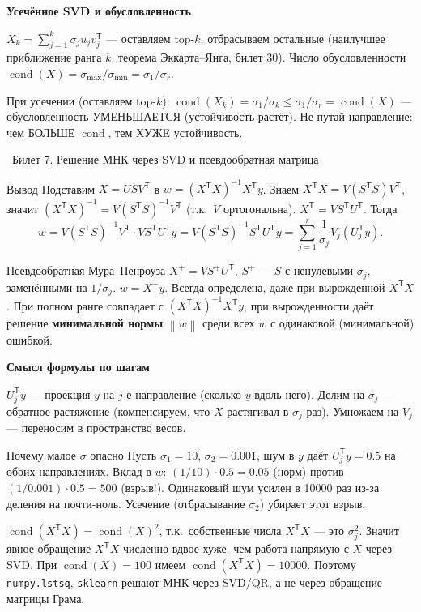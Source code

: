 \documentclass[12pt, a4paper]{article}
\newcommand{\bilet}[2]{%
  \vspace{10pt}%
  \noindent\colorbox{qcolor}{\parbox{\dimexpr\linewidth-2\fboxsep\relax}{%
    \color{white}\large\bfseries\strut\ Билет #1. #2%
  }}%
  \nopagebreak\vspace{5pt}\par\nopagebreak%
}
\newcommand{\qsub}[1]{%
  \vspace{5pt}%
  {\bfseries\color{defblue} #1}%
  \par\vspace{2pt}%
}
\newcommand{\cond}{\operatorname{cond}}
\newcommand{\tr}{^{\mathsf{T}}}
\newcommand{\norm}[1]{\left\lVert #1 \right\rVert}
\begin{document}
\qsub{Усечённое SVD и обусловленность}
$X_k = \sum_{j=1}^k \sigma_j u_j v_j\tr$ --- оставляем top-$k$, отбрасываем остальные (наилучшее приближение ранга $k$, теорема Эккарта--Янга, билет 30). Число обусловленности $\cond(X) = \sigma_{\max}/\sigma_{\min} = \sigma_1/\sigma_r$.

\begin{fishkabox}
При усечении (оставляем top-$k$): $\cond(X_k) = \sigma_1/\sigma_k \le \sigma_1/\sigma_r = \cond(X)$ --- обусловленность УМЕНЬШАЕТСЯ (устойчивость растёт). Не путай направление: чем БОЛЬШЕ $\cond$, тем ХУЖE устойчивость.
\end{fishkabox}

\bilet{7}{Решение МНК через SVD и псевдообратная матрица}

\begin{proofbox}{Вывод}
Подставим $X = USV\tr$ в $w = (X\tr X)^{-1}X\tr y$. Знаем $X\tr X = V(S\tr S)V\tr$, значит $(X\tr X)^{-1} = V(S\tr S)^{-1}V\tr$ (т.к.\ $V$ ортогональна). $X\tr = VS\tr U\tr$. Тогда
\[
  w = V(S\tr S)^{-1}V\tr \cdot V S\tr U\tr y = V(S\tr S)^{-1}S\tr U\tr y = \sum_{j=1}^r \frac{1}{\sigma_j} V_j (U_j\tr y).
\]
\end{proofbox}

\begin{defbox}{Псевдообратная Мура--Пенроуза}
$X^+ = V S^+ U\tr$, $S^+$ --- $S$ с ненулевыми $\sigma_j$, заменёнными на $1/\sigma_j$. $w = X^+ y$. Всегда определена, даже при вырожденной $X\tr X$. При полном ранге совпадает с $(X\tr X)^{-1}X\tr y$; при вырожденности даёт решение \textbf{минимальной нормы} $\norm{w}$ среди всех $w$ с одинаковой (минимальной) ошибкой.
\end{defbox}

\qsub{Смысл формулы по шагам}
$U_j\tr y$ --- проекция $y$ на $j$-е направление (сколько $y$ вдоль него). Делим на $\sigma_j$ --- обратное растяжение (компенсируем, что $X$ растягивал в $\sigma_j$ раз). Умножаем на $V_j$ --- переносим в пространство весов.

\begin{exbox}{Почему малое $\sigma$ опасно}
Пусть $\sigma_1 = 10$, $\sigma_2 = 0.001$, шум в $y$ даёт $U_j\tr y = 0.5$ на обоих направлениях. Вклад в $w$: $(1/10)\cdot 0.5 = 0.05$ (норм) против $(1/0.001)\cdot 0.5 = 500$ (взрыв!). Одинаковый шум усилен в 10000 раз из-за деления на почти-ноль. Усечение (отбрасывание $\sigma_2$) убирает этот взрыв.
\end{exbox}

\begin{fishkabox}
$\cond(X\tr X) = \cond(X)^2$, т.к.\ собственные числа $X\tr X$ --- это $\sigma_j^2$. Значит явное обращение $X\tr X$ численно вдвое хуже, чем работа напрямую с $X$ через SVD. При $\cond(X) = 100$ имеем $\cond(X\tr X) = 10000$. Поэтому \texttt{numpy.lstsq}, \texttt{sklearn} решают МНК через SVD/QR, а не через обращение матрицы Грама.
\end{fishkabox}
\end{document}
